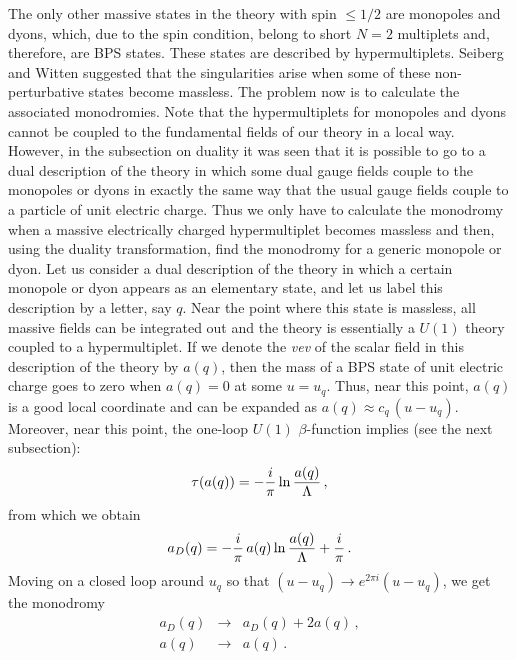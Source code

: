 The only other massive states in the theory with spin $\le 1/2$ are
monopoles and dyons, which, due to the spin condition, belong to short
$N=2$ multiplets and, therefore, are BPS states. These states are
described by hypermultiplets. Seiberg and Witten suggested that the
singularities arise when some of these non-perturbative states become
massless.  The problem now is to calculate the associated
monodromies. Note that the hypermultiplets for monopoles and dyons
cannot be coupled to the fundamental fields of our theory in a local
way. However, in the subsection on duality it was seen that it is
possible to go to a dual description of the theory in which some dual
gauge fields couple to the monopoles or dyons in exactly the same way
that the usual gauge fields couple to a particle of unit electric
charge. Thus we only have to calculate the monodromy when a massive
electrically charged hypermultiplet becomes massless and then, using
the duality transformation, find the monodromy for a generic monopole
or dyon. Let us consider a dual description of the theory in which a
certain monopole or dyon appears as an elementary state, and let us
label this description by a letter, say $q$. Near the point where this
state is massless, all massive fields can be integrated out and the
theory is essentially a $U(1)$ theory coupled to a hypermultiplet. If
we denote the {\it vev} of the scalar field in this description of the
theory by $a(q)$, then the mass of a BPS state of unit electric charge
goes to zero when $a(q)=0$ at some $u=u_q$. Thus, near this point,
$a(q)$ is a good local coordinate and can be expanded as $a(q)\approx
c_q\,(u-u_q)$. Moreover, near this point, the one-loop $U(1)$
$\beta$-function implies (see the next subsection):
$$
\tau (a(q))=-\frac{i}{\pi}\,{\rm ln}\,\frac{a(q)}{\Lambda}\,,
$$
from which we obtain
$$
a_D(q)=-\frac{i}{\pi}\,a(q)\,{\rm ln}\,\frac{a(q)}{\Lambda}+
\frac{i}{\pi} \,.
$$
Moving on a closed loop around $u_q$ so that $(u-u_q)\rightarrow
e^{2\pi i} (u-u_q)$, we get the monodromy
\begin{equation}
\begin{array}{rcl}
a_D(q)& \rightarrow & a_D(q) + 2 a(q)\,,\\
a(q)  & \rightarrow & a(q)\,.
\end{array}
\label{mondq}
\end{equation}

